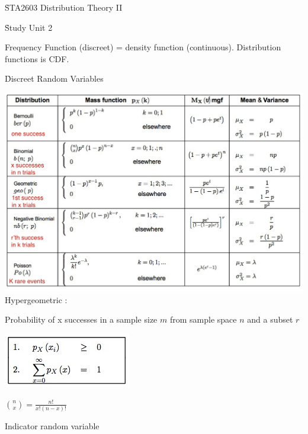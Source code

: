 \documentclass{examnotes}
\begin{document}
\h{STA2603 Distribution Theory II}

{} \hfill  {}


\h{Study Unit 2}

Frequency Function (discreet) = density function (continuous).
Distribution functions is CDF.

\h{Discreet Random Variables}


 \includegraphics[scale=0.5]{./img/disscreet.jpg}
Hypergeometric :

Probability of x successes in a sample size $m$ from sample space $n$ and a subset $r$  

\includegraphics[scale=0.8]{./img/2dis.jpg}

$\binom{n}{x} = \displaystyle\frac{n!}{x!(n-x)!}$

\vspace{6pt}

Indicator random variable  %
\end{document}
